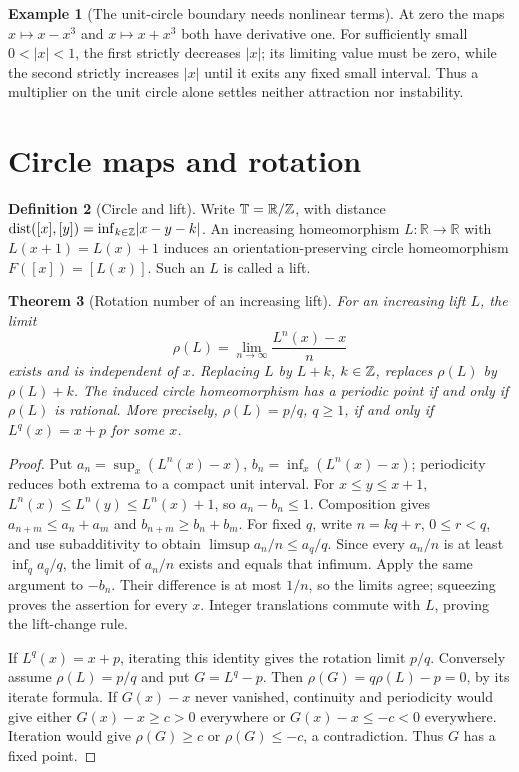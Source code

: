 \documentclass[11pt,oneside]{book}
\newtheorem{theorem}{Theorem}[chapter]
\theoremstyle{definition}
\newtheorem{definition}[theorem]{Definition}
\newtheorem{example}[theorem]{Example}
\theoremstyle{remark}\newtheorem{remark}[theorem]{Remark}
\newcommand{\R}{\mathbb R}\newcommand{\C}{\mathbb C}
\newcommand{\abs}[1]{\lvert#1\rvert}\newcommand{\norm}[1]{\lVert#1\rVert}
\begin{document}
\begin{example}[The unit-circle boundary needs nonlinear terms]
At zero the maps \(x\mapsto x-x^3\) and \(x\mapsto x+x^3\) both have
derivative one. For sufficiently small \(0<\abs{x}<1\), the first
strictly decreases \(\abs{x}\); its limiting value must be zero, while
the second strictly increases \(\abs{x}\) until it exits any fixed
small interval. Thus a multiplier on the unit circle alone settles
neither attraction nor instability.
\end{example}

\section{Circle maps and rotation}

\begin{definition}[Circle and lift]\label{d13:15:circle-lift}
Write \(\mathbb T=\R/\Z\), with distance
\(\dist([x],[y])=\inf_{k\in\Z}\abs{x-y-k}\).
An increasing homeomorphism \(L:\R\to\R\) with \(L(x+1)=L(x)+1\)
induces an orientation-preserving circle homeomorphism
\(F([x])=[L(x)]\). Such an \(L\) is called a lift.
\end{definition}

\begin{theorem}[Rotation number of an increasing lift]\label{d13:15:rotation-number}
For an increasing lift \(L\), the limit
\[
 \rho(L)=\lim_{n\to\infty}\frac{L^n(x)-x}{n}
\]
exists and is independent of \(x\). Replacing \(L\) by \(L+k\),
\(k\in\mathbb Z\), replaces \(\rho(L)\) by \(\rho(L)+k\).
The induced circle homeomorphism has a periodic point if and only if
\(\rho(L)\) is rational. More precisely, \(\rho(L)=p/q\), \(q\geq1\),
if and only if \(L^q(x)=x+p\) for some \(x\).
\end{theorem}
\begin{proof}
Put \(a_n=\sup_x(L^n(x)-x)\), \(b_n=\inf_x(L^n(x)-x)\); periodicity
reduces both extrema to a compact unit interval. For \(x\leq y\leq x+1\),
\(L^n(x)\leq L^n(y)\leq L^n(x)+1\), so \(a_n-b_n\leq1\).
Composition gives \(a_{n+m}\leq a_n+a_m\) and
\(b_{n+m}\geq b_n+b_m\). For fixed \(q\), write \(n=kq+r\),
\(0\leq r<q\), and use subadditivity to obtain
\(\limsup a_n/n\leq a_q/q\). Since every \(a_n/n\) is at least
\(\inf_q a_q/q\), the limit of \(a_n/n\) exists and equals that infimum.
Apply the same argument to \(-b_n\). Their difference is at most \(1/n\),
so the limits agree; squeezing proves the assertion for every \(x\).
Integer translations commute with \(L\), proving the lift-change rule.

If \(L^q(x)=x+p\), iterating this identity gives the rotation limit
\(p/q\). Conversely assume \(\rho(L)=p/q\) and put \(G=L^q-p\).
Then \(\rho(G)=q\rho(L)-p=0\), by its iterate formula. If \(G(x)-x\)
never vanished, continuity and periodicity would give either
\(G(x)-x\geq c>0\) everywhere or \(G(x)-x\leq-c<0\) everywhere.
Iteration would give \(\rho(G)\geq c\) or \(\rho(G)\leq-c\), a
contradiction. Thus \(G\) has a fixed point.
\end{proof}
\end{document}
